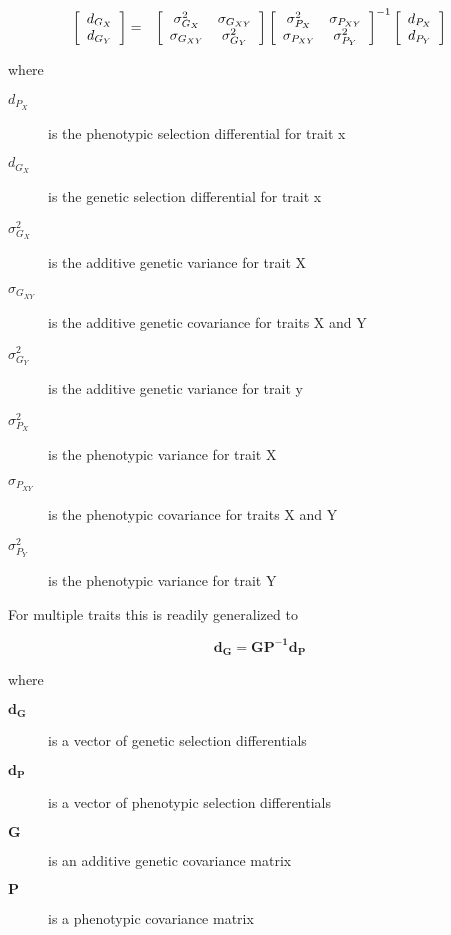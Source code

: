 \documentclass[titlepage]{article}  %
\begin{document}
\begin{eqnarray*}
 \left[ \begin{array}{c}
 d_{G_{X}} \\
 d_{G_{Y}}
\end{array} \right] 
 & = &
 \left[ \begin{array}{c c}
 \sigma^{2}_{G_{X}} & \sigma_{G_{XY}} \\
 \sigma_{G_{XY}} & \sigma^{2}_{G_{Y}}
\end{array} \right] 
\left[ \begin{array}{cc}
 \sigma^{2}_{P_{X}} & \sigma_{P_{XY}} \\
 \sigma_{P_{XY}} & \sigma^{2}_{P_{Y}}
\end{array} \right] ^{-1}
 \left[ \begin{array}{c}
 d_{P_{X}} \\
 d_{P_{Y}}
\end{array} \right]
\end{eqnarray*}

where
\begin{description}
\item[$d_{P_{X}}$] is the phenotypic selection differential for trait x
\item[$d_{G_{X}}$] is the genetic selection differential for trait x
\item[$\sigma^{2}_{G_{X}}$] is the additive genetic variance for trait X
\item[$\sigma_{G_{XY}}$] is the additive genetic covariance for traits X and Y
\item[$\sigma^{2}_{G_{Y}}$] is the additive genetic variance for trait y
\item[$\sigma^{2}_{P_{X}}$] is the phenotypic variance for trait X
\item[$\sigma_{P_{XY}}$] is the phenotypic covariance for traits X and Y
\item[$\sigma^{2}_{P_{Y}}$] is the phenotypic variance for trait Y
\end{description}

For multiple traits this is readily generalized to 

\begin{equation}
\bm{d_{G} = G P^{-1} d_{P}}  \label{eq.mbe}
\end{equation}

where
\begin{description}
\item[$\bm{d_{G}}$] is a vector of genetic selection differentials
\item[$\bm{d_{P}}$] is a vector of phenotypic selection differentials
\item[$\bm{G}$] is an additive genetic covariance matrix
\item[$\bm{P}$] is a phenotypic covariance matrix
\end{description}
\end{document}
